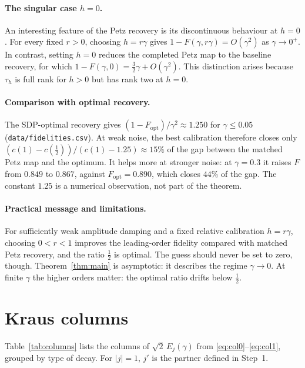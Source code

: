 \documentclass[11pt,a4paper]{article}
\theoremstyle{plain}
\newcommand{\wt}[1]{\lvert #1\rvert}
\begin{document}
\paragraph{The singular case $h=0$.} An interesting feature of the Petz recovery is its discontinuous behaviour at $h=0$. For every fixed $r>0$, choosing $h=r\gamma$ gives $1-F(\gamma,r\gamma)=O(\gamma^2)$ as $\gamma\to0^+$. In contrast, setting $h=0$ reduces the completed Petz map to the baseline recovery, for which $1-F(\gamma,0)=\frac32\gamma+O(\gamma^2)$. This distinction arises because $\tau_h$ is full rank for $h>0$ but has rank two at $h=0$.

\paragraph{Comparison with optimal recovery.} The SDP-optimal recovery gives $(1-F_{\mathrm{opt}})/\gamma^2\approx1.250$ for $\gamma\le0.05$ (\texttt{data/fidelities.csv}). At weak noise, the best calibration therefore closes only $(c(1)-c(\frac12))/(c(1)-1.25)\approx15\%$ of the gap between the matched Petz map and the optimum. It helps more at stronger noise: at $\gamma=0.3$ it raises $F$ from $0.849$ to $0.867$, against $F_{\mathrm{opt}}=0.890$, which closes $44\%$ of the gap. The constant $1.25$ is a numerical observation, not part of the theorem.


\paragraph{Practical message and limitations.} For sufficiently weak amplitude damping and a fixed relative calibration $h=r\gamma$, choosing $0<r<1$ improves the leading-order fidelity compared with matched Petz recovery, and the ratio $\frac12$ is optimal. The guess should never be set to zero, though. Theorem~\ref{thm:main} is asymptotic: it describes the regime $\gamma\to0$. At finite $\gamma$ the higher orders matter: the optimal ratio drifts below $\frac12$.

\appendix
\section{Kraus columns}\label{app:columns}

Table~\ref{tab:columns} lists the columns of $\sqrt2\,E_j(\gamma)$ from \eqref{eq:col0}--\eqref{eq:col1}, grouped by type of decay. For $\wt{j}=1$, $j'$ is the partner defined in Step~1.
\end{document}
